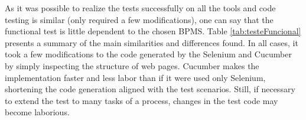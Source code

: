 \documentclass[runningheads,a4paper]{llncs}
\begin{document}

As it was possible to realize the tests successfully on all the tools and code testing is similar (only required a few modifications), one can say that the functional test is little dependent to the chosen BPMS. Table \ref{tab:testeFuncional} presents a summary of the main similarities and differences found. In all cases, it took a few modifications to the code generated by the Selenium and Cucumber by simply inspecting the structure of web pages. Cucumber makes the implementation faster and less labor than if it were used only Selenium, shortening the code generation aligned with the test scenarios. Still, if necessary to extend the test to many tasks of a process, changes in the test code may become laborious.

\end{document}
